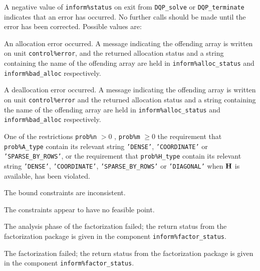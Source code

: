 \documentclass{galahad}
\newcommand{\packagename}{DQP}
\begin{document}

\galerrors
A negative value of {\tt inform\%status} on exit from
{\tt \packagename\_solve}
or
{\tt \packagename\_terminate}
indicates that an error has occurred. No further calls should be made
until the error has been corrected. Possible values are:

\begin{description}

 An allocation error occurred. A message indicating
the offending
array is written on unit {\tt control\%error}, and the returned allocation
status and a string containing the name of the offending array
are held in {\tt inform\%alloc\_\-status}
and {\tt inform\%bad\_alloc} respectively.

 A deallocation error occurred.
A message indicating the offending
array is written on unit {\tt control\%error} and the returned allocation
status and a string containing the name of the offending array
are held in {\tt inform\%alloc\_\-status}
and {\tt inform\%bad\_alloc} respectively.

 One of the restrictions
 {\tt prob\%n} $> 0$ ,  {\tt prob\%m} $\geq 0$
    the requirement that {\tt prob\%A\_type} contain its relevant string
    {\tt 'DENSE'}, {\tt 'COORDINATE'} or {\tt 'SPARSE\_BY\_ROWS'},
    or the requirement that
    {\tt prob\%H\_type} contain its relevant string
    {\tt 'DENSE'}, {\tt 'COORDINATE'}, {\tt 'SPARSE\_BY\_ROWS'}
    or {\tt 'DIAGONAL'} when ${\mathbf{H}}$ is available,
    has been violated.


 The bound constraints are inconsistent.

 The constraints appear to have no feasible point.

 The analysis phase of the factorization failed;
  the return status from the factorization
    package is given in the component {\tt inform\%fac\-t\-or\_status}.

 The factorization failed; the return status
  from the factorization
    package is given in the component {\tt inform\%fac\-t\-or\_status}.


\end{description}
\end{document}
